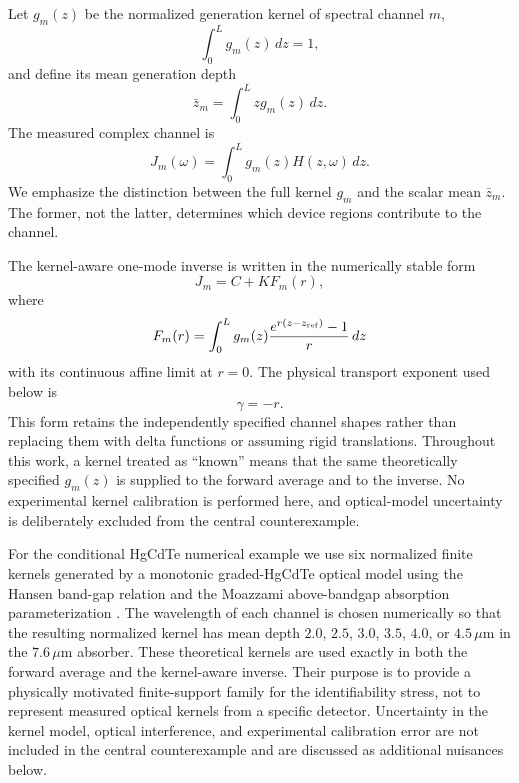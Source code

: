 \documentclass[aps,pra,twocolumn,superscriptaddress,nofootinbib]{revtex4-2}
\begin{document}
Let $g_m(z)$ be the normalized generation kernel of spectral channel $m$,
\begin{equation}
\int_0^L g_m(z)\,dz=1,
\end{equation}
and define its mean generation depth
\begin{equation}
\bar z_m=\int_0^L z g_m(z)\,dz.
\end{equation}
The measured complex channel is
\begin{equation}
\boxed{
J_m(\omega)=\int_0^L g_m(z)H(z,\omega)\,dz.
}
\label{eq:channel}
\end{equation}
We emphasize the distinction between the full kernel $g_m$ and the scalar mean $\bar z_m$. The former, not the latter, determines which device regions contribute to the channel.

The kernel-aware one-mode inverse is written in the numerically stable form
\begin{equation}
J_m=C+K F_m(r),
\label{eq:onemode}
\end{equation}
where
\begin{equation}
F_m(r)=\int_0^L g_m(z)
\frac{e^{r(z-z_{\rm ref})}-1}{r}\,dz
\end{equation}
with its continuous affine limit at $r=0$. The physical transport exponent used below is
\begin{equation}
\gamma=-r.
\end{equation}
This form retains the independently specified channel shapes rather than replacing them with delta functions or assuming rigid translations.  Throughout this work, a kernel treated as ``known'' means that the same theoretically specified $g_m(z)$ is supplied to the forward average and to the inverse.  No experimental kernel calibration is performed here, and optical-model uncertainty is deliberately excluded from the central counterexample.

For the conditional HgCdTe numerical example we use six normalized finite kernels generated by a monotonic graded-HgCdTe optical model using the Hansen band-gap relation and the Moazzami above-bandgap absorption parameterization \cite{hansen1982gap,moazzami2005absorption}.  The wavelength of each channel is chosen numerically so that the resulting normalized kernel has mean depth $2.0$, $2.5$, $3.0$, $3.5$, $4.0$, or $4.5\,\mu\mathrm{m}$ in the $7.6\,\mu\mathrm{m}$ absorber.  These theoretical kernels are used exactly in both the forward average and the kernel-aware inverse.  Their purpose is to provide a physically motivated finite-support family for the identifiability stress, not to represent measured optical kernels from a specific detector.  Uncertainty in the kernel model, optical interference, and experimental calibration error are not included in the central counterexample and are discussed as additional nuisances below.
\end{document}

